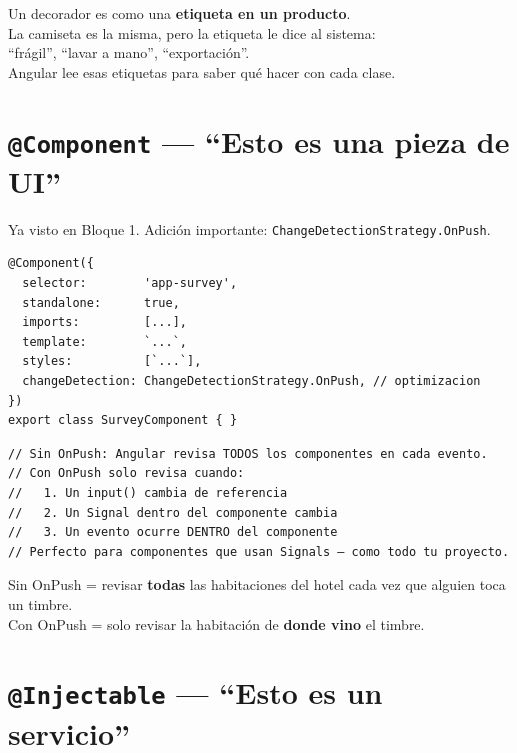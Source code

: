 \documentclass[12pt, a4paper]{article}
\begin{document}
\begin{tcolorbox}[analogia, title={\emoji{label} \emoji{t-shirt} La Etiqueta del Producto}]
  Un decorador es como una \textbf{etiqueta en un producto}.\\
  La camiseta es la misma, pero la etiqueta le dice al sistema:\\
  ``frágil'', ``lavar a mano'', ``exportación''.\\[0.3cm]
  Angular lee esas etiquetas para saber qué hacer con cada clase.
\end{tcolorbox}

\section{  \texttt{@Component} --- ``Esto es una pieza de UI''}

Ya visto en Bloque 1. Adición importante: \texttt{ChangeDetectionStrategy.OnPush}.

\begin{lstlisting}
@Component({
  selector:        'app-survey',
  standalone:      true,
  imports:         [...],
  template:        `...`,
  styles:          [`...`],
  changeDetection: ChangeDetectionStrategy.OnPush, // optimizacion
})
export class SurveyComponent { }
\end{lstlisting}

\begin{lstlisting}
// Sin OnPush: Angular revisa TODOS los componentes en cada evento.
// Con OnPush solo revisa cuando:
//   1. Un input() cambia de referencia
//   2. Un Signal dentro del componente cambia
//   3. Un evento ocurre DENTRO del componente
// Perfecto para componentes que usan Signals — como todo tu proyecto.
\end{lstlisting}

\begin{tcolorbox}[analogia, title={\emoji{racing-car} \emoji{zap} El Modo Turbo}]
  Sin OnPush = revisar \textbf{todas} las habitaciones del hotel cada vez que alguien toca un timbre.\\
  Con OnPush = solo revisar la habitación de \textbf{donde vino} el timbre.
\end{tcolorbox}

\section{  \texttt{@Injectable} --- ``Esto es un servicio''}
\end{document}
